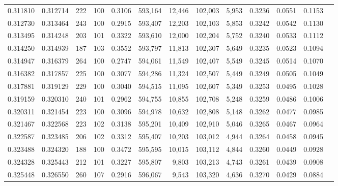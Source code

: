 \begin{tabular}{rrrrrrrrrrrrr}
0.311810 & 0.312714 &   222 & 100 &                                     0.3106 & 593,164 &  12,446 & 102,003 &   5,953 & 0.3236 & 0.0551 & 0.1153 \\
0.312730 & 0.313464 &   243 & 100 &                                     0.2915 & 593,407 &  12,203 & 102,103 &   5,853 & 0.3242 & 0.0542 & 0.1130 \\
0.313495 & 0.314248 &   203 & 101 &                                     0.3322 & 593,610 &  12,000 & 102,204 &   5,752 & 0.3240 & 0.0533 & 0.1112 \\
0.314250 & 0.314939 &   187 & 103 &                                     0.3552 & 593,797 &  11,813 & 102,307 &   5,649 & 0.3235 & 0.0523 & 0.1094 \\
0.314947 & 0.316379 &   264 & 100 &                                     0.2747 & 594,061 &  11,549 & 102,407 &   5,549 & 0.3245 & 0.0514 & 0.1070 \\
0.316382 & 0.317857 &   225 & 100 &                                     0.3077 & 594,286 &  11,324 & 102,507 &   5,449 & 0.3249 & 0.0505 & 0.1049 \\
0.317881 & 0.319129 &   229 & 100 &                                     0.3040 & 594,515 &  11,095 & 102,607 &   5,349 & 0.3253 & 0.0495 & 0.1028 \\
0.319159 & 0.320310 &   240 & 101 &                                     0.2962 & 594,755 &  10,855 & 102,708 &   5,248 & 0.3259 & 0.0486 & 0.1006 \\
0.320311 & 0.321454 &   223 & 100 &                                     0.3096 & 594,978 &  10,632 & 102,808 &   5,148 & 0.3262 & 0.0477 & 0.0985 \\
0.321467 & 0.322568 &   223 & 102 &                                     0.3138 & 595,201 &  10,409 & 102,910 &   5,046 & 0.3265 & 0.0467 & 0.0964 \\
0.322587 & 0.323485 &   206 & 102 &                                     0.3312 & 595,407 &  10,203 & 103,012 &   4,944 & 0.3264 & 0.0458 & 0.0945 \\
0.323488 & 0.324320 &   188 & 100 &                                     0.3472 & 595,595 &  10,015 & 103,112 &   4,844 & 0.3260 & 0.0449 & 0.0928 \\
0.324328 & 0.325443 &   212 & 101 &                                     0.3227 & 595,807 &   9,803 & 103,213 &   4,743 & 0.3261 & 0.0439 & 0.0908 \\
0.325448 & 0.326550 &   260 & 107 &                                     0.2916 & 596,067 &   9,543 & 103,320 &   4,636 & 0.3270 & 0.0429 & 0.0884 \\

\end{tabular}
